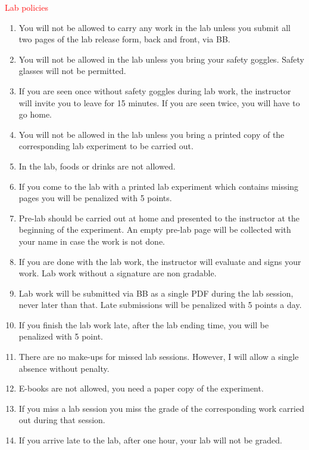 \documentclass[cover.tex]{subfiles}
\begin{document}
 


\begin{mdframed}[style=MyFrame]
\begin{center}{\textcolor{red}{\Large Lab policies}}\end{center}
\begin{enumerate}
\item You will not be allowed to carry any work in the lab unless you submit all two pages of the lab release form, back and front, via BB.
\item You will not be allowed in the lab unless you bring your safety goggles. Safety glasses will not be permitted.
\item If you are seen once without safety goggles during lab work, the instructor will invite you to leave for 15 minutes. If you are seen twice, you will have to go home.
\item You will not be allowed in the lab unless you bring a printed copy of the corresponding lab experiment to be carried out.
\item In the lab, foods or drinks are not allowed.
\item If you come to the lab with a printed lab experiment which contains missing pages you will be penalized with 5 points. 
\item Pre-lab should be carried out at home and presented to the instructor at the beginning of the experiment. An empty pre-lab page will be collected with your name in case the work is not done.
\item If you are done with the lab work, the instructor will evaluate and signs your work. Lab work without a signature are non gradable.
\item Lab work will be submitted via BB as a single PDF during the lab session, never later than that. Late submissions will be penalized with 5 points a day. 
\item If you finish the lab work late, after the lab ending time, you will be penalized with 5 point.
\item There are no make-ups for missed lab sessions. However, I will allow a single absence without penalty.
\item E-books are not allowed, you need a paper copy of the experiment.
\item If you miss a lab session you miss the grade of the corresponding work carried out during that session.
\item If you arrive late to the lab, after one hour, your lab will not be graded.
\end{enumerate}

    \par\noindent\makebox[1.5in]{\hrulefill}   \hfill\makebox[2.0in]{\hrulefill}    \hfill\makebox[2.0in]{\hrulefill}  \par\noindent{}    \hfill{}   \hfill{} 

\end{mdframed}
\end{document}
